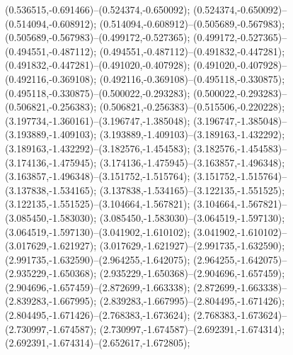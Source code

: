  (0.536515,-0.691466)--(0.524374,-0.650092);
 (0.524374,-0.650092)--(0.514094,-0.608912);
 (0.514094,-0.608912)--(0.505689,-0.567983);
 (0.505689,-0.567983)--(0.499172,-0.527365);
 (0.499172,-0.527365)--(0.494551,-0.487112);
 (0.494551,-0.487112)--(0.491832,-0.447281);
 (0.491832,-0.447281)--(0.491020,-0.407928);
 (0.491020,-0.407928)--(0.492116,-0.369108);
 (0.492116,-0.369108)--(0.495118,-0.330875);
 (0.495118,-0.330875)--(0.500022,-0.293283);
 (0.500022,-0.293283)--(0.506821,-0.256383);
 (0.506821,-0.256383)--(0.515506,-0.220228);
 (3.197734,-1.360161)--(3.196747,-1.385048);
 (3.196747,-1.385048)--(3.193889,-1.409103);
 (3.193889,-1.409103)--(3.189163,-1.432292);
 (3.189163,-1.432292)--(3.182576,-1.454583);
 (3.182576,-1.454583)--(3.174136,-1.475945);
 (3.174136,-1.475945)--(3.163857,-1.496348);
 (3.163857,-1.496348)--(3.151752,-1.515764);
 (3.151752,-1.515764)--(3.137838,-1.534165);
 (3.137838,-1.534165)--(3.122135,-1.551525);
 (3.122135,-1.551525)--(3.104664,-1.567821);
 (3.104664,-1.567821)--(3.085450,-1.583030);
 (3.085450,-1.583030)--(3.064519,-1.597130);
 (3.064519,-1.597130)--(3.041902,-1.610102);
 (3.041902,-1.610102)--(3.017629,-1.621927);
 (3.017629,-1.621927)--(2.991735,-1.632590);
 (2.991735,-1.632590)--(2.964255,-1.642075);
 (2.964255,-1.642075)--(2.935229,-1.650368);
 (2.935229,-1.650368)--(2.904696,-1.657459);
 (2.904696,-1.657459)--(2.872699,-1.663338);
 (2.872699,-1.663338)--(2.839283,-1.667995);
 (2.839283,-1.667995)--(2.804495,-1.671426);
 (2.804495,-1.671426)--(2.768383,-1.673624);
 (2.768383,-1.673624)--(2.730997,-1.674587);
 (2.730997,-1.674587)--(2.692391,-1.674314);
 (2.692391,-1.674314)--(2.652617,-1.672805);
